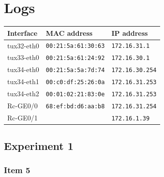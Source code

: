 \documentclass[a4paper, 11pt]{report}
\begin{document}
\fancyhfoffset{0pt}
\chapter{Logs}

\renewcommand{\thelstlisting}{%
  \thechapter.\thesubsection(\arabic{lstlisting})%
}

\begin{center}
    \begin{tabular}{l | l | l}
        \textbf{Interface} & \textbf{MAC address}       & \textbf{IP address}    \\ \hline
        tux32-eth0         & \texttt{00:21:5a:61:30:63} & \texttt{172.16.31.1  } \\
        tux33-eth0         & \texttt{00:21:5a:61:24:92} & \texttt{172.16.30.1  } \\
        tux34-eth0         & \texttt{00:21:5a:5a:7d:74} & \texttt{172.16.30.254} \\
        tux34-eth1         & \texttt{00:c0:df:25:26:0a} & \texttt{172.16.31.253} \\
        tux34-eth2         & \texttt{00:01:02:21:83:0e} & \texttt{172.16.31.253} \\
        Rc-GE0/0           & \texttt{68:ef:bd:d6:aa:b8} & \texttt{172.16.31.254} \\
        Rc-GE0/1           & \texttt{                 } & \texttt{172.16.1.39  } \\
    \end{tabular}
\end{center}

\section{Experiment 1}
\setcounter{subsection}{4}
\subsection{Item 5}




\end{document}
